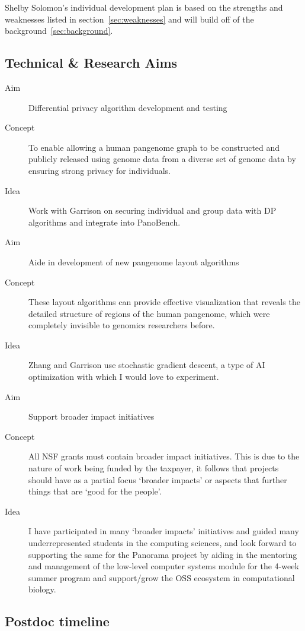 Shelby Solomon's individual development plan is based on the strengths and weaknesses listed in section~\ref{sec:weaknesses} and will build off of the background~\ref{sec:background}.

\subsection{Technical \& Research Aims}

\begin{description}
	\item[Aim] Differential privacy algorithm development and testing
	\item[Concept] To enable allowing a human pangenome graph to be constructed and publicly released using genome data from a diverse set of genome data by ensuring strong privacy for individuals.
	\item[Idea] Work with Garrison on securing individual and group data with DP algorithms and integrate into PanoBench.
\end{description}

\begin{description}
	\item[Aim] Aide in development of new pangenome layout algorithms
	\item[Concept] These layout algorithms can provide effective visualization that reveals the detailed structure of regions of the human pangenome, which were completely invisible to genomics researchers before.
	\item[Idea] Zhang and Garrison use stochastic gradient descent, a type of AI optimization with which I would love to experiment.
\end{description}

\begin{description}
	\item[Aim] Support broader impact initiatives 
	\item[Concept] All NSF grants must contain broader impact initiatives. This is due to the nature of work being funded by the taxpayer, it follows that projects should have as a partial focus `broader impacts' or aspects that further things that are `good for the people'.
	\item[Idea] I have participated in many `broader impacts' initiatives and guided many underrepresented students in the computing sciences, and look forward to supporting the same for the Panorama project by aiding in the mentoring and management of the low-level computer systems module for the 4-week summer program and support/grow the OSS ecosystem in computational biology.
\end{description}


\subsection{Postdoc timeline}
